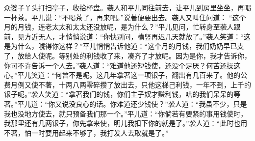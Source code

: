 \begin{parag}
    众婆子丫头打扫亭子，收拾杯盘。袭人和平儿同往前去，让平儿到房里坐坐，再喝一杯茶。平儿说：“不喝茶了，再来吧。”说著便要出去。袭人又叫住问道： “这个月的月钱，连老太太和太太还没放呢，是为什么？”平儿见问，忙转身至袭人跟前，见方近无人，才悄悄说道：“你快别问，横竖再迟几天就放了。”袭人笑道：“这是为什么，唬得你这样？”平儿悄悄告诉他道：“这个月的月钱，我们奶奶早已支了，放给人使呢。等别处的利钱收了来，凑齐了才放呢。因为是你，我才告诉你，你可不许告诉一个人去。”袭人道：“难道他还短钱使，还没个足厌？何苦还操这心。”平儿笑道：“何曾不是呢。这几年拿著这一项银子，翻出有几百来了。他的公费月例又使不著，十两八两零碎攒了放出去，只他这梯己利钱，一年不到，上千的银子呢。”袭人笑道：“拿著我们的钱，你们主子奴才赚利钱，哄的我们呆呆的等著。”平儿道：“你又说没良心的话。你难道还少钱使？”袭人道：“我虽不少，只是我也没地方使去，就只预备我们那一个。”平儿道：“你倘若有要紧的事用钱使时，我那里还有几两银子，你先拿来使，明儿我扣下你的就是了。”袭人道：“此时也用不著，怕一时要用起来不够了，我打发人去取就是了。”
\end{parag}


